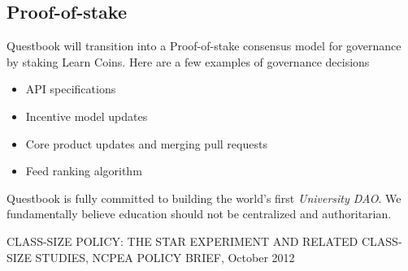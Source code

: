 \documentclass{article}
\begin{document}
    \subsection{Proof-of-stake}
      Questbook will transition into a Proof-of-stake consensus model for governance by staking Learn Coins.
      Here are a few examples of governance decisions 
      \begin{itemize}
        \item API specifications
        \item Incentive model updates
        \item Core product updates and merging pull requests
        \item Feed ranking algorithm 
      \end{itemize}

    Questbook is fully committed to building the world's first \textit{University DAO}.
    We fundamentally believe education should not be centralized and authoritarian.

  \begin{thebibliography}{9}
     CLASS-SIZE POLICY: THE STAR EXPERIMENT AND RELATED CLASS-SIZE STUDIES, NCPEA	POLICY	BRIEF, October 2012
  \end{thebibliography}
\end{document}
